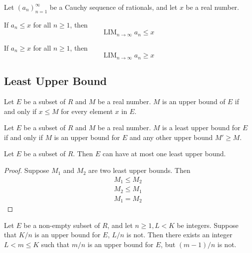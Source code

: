 \documentclass{blog}
\DeclareMathOperator{\LIM}{LIM}
\begin{document}
\begin{lemma}
  Let $(a_{n})_{n = 1}^{\infty}$ be a Cauchy sequence of rationals,
  and let $x$ be a real number.

  If $a_{n} \leq x$ for all $n \geq 1$, then
  \begin{equation*}
    \LIM_{n \to \infty} a_{n} \leq x
  \end{equation*}

  If $a_{n} \geq x$ for all $n \geq 1$, then
  \begin{equation*}
    \LIM_{n \to \infty} a_{n} \geq x
  \end{equation*}
\end{lemma}

\subsection{Least Upper Bound}
\begin{definition}
  Let $E$ be a subset of $R$ and $M$ be a real number.
  $M$ is an upper bound of $E$ if and only if $x \leq M$ for every element $x$ in $E$.
\end{definition}

\begin{definition}
  Let $E$ be a subset of $R$ and $M$ be a real number.
  $M$ is a least upper bound for $E$ if and only if
  $M$ is an upper bound for $E$ and any other upper bound $M' \geq M$.
\end{definition}

\begin{proposition}
  Let $E$ be a subset of $R$. Then $E$ can have at most one least upper bound.
\end{proposition}

\begin{proof}
  Suppose $M_{1}$ and $M_{2}$ are two least upper bounds.
  Then
  \begin{gather*}
    M_{1}\leq M_{2} \\
    M_{2} \leq M_{1}\\
    M_{1}= M_{2}
  \end{gather*}
\end{proof}

\begin{lemma}
  Let $E$ be a non-empty subset of $R$,
  and let $n \geq 1, L < K$ be integers.
  Suppose that $K/n$ is an upper bound for $E$,
  $L / n$ is not. Then there exists an integer $L < m \leq K$
  such that $m / n$ is an upper bound for $E$,
  but $(m - 1) / n$ is not.
\end{lemma}
\end{document}
